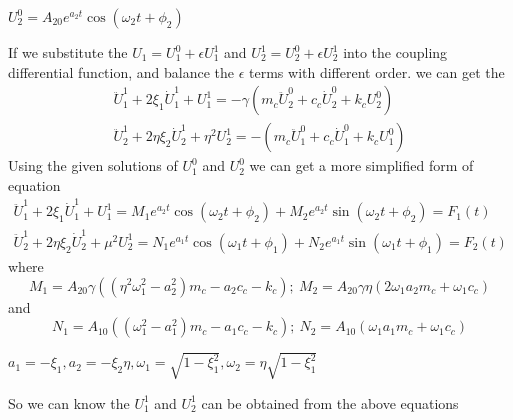 \documentclass{article}
\begin{document}
$U_2^0=A_{20} e^{a_2 t}\cos(\omega_2 t + \phi_2)$

If we substitute the $U_1=U_1^0+\epsilon U_1^1$ and $U_2^1=U_2^0+\epsilon U_2^1$ into the coupling differential function, and balance the $\epsilon$ terms with different order. we can get the 
\begin{align}
    \ddot{U}_1^1+2 \xi_1 \dot{U}_1^1+U_1^1=- \gamma (m_c \ddot{U}_2^0+c_c \dot{U}_2^0+k_c U_2^0)\\
    \ddot{U}_2^1+2 \eta \xi_2 \dot{U}_2^1+\eta^2 U_2^1= -(m_c \ddot{U}_1^0+c_c \dot{U}_1^0+k_c U_1^0)
\end{align}
Using the given solutions of $U_1^0$ and $U_2^0$ we can get a more simplified form of equation
\begin{align}
    \ddot{U}_1^1+2 \xi_1 \dot{U}_1^1+U_1^1=M_1 e^{a_2 t} \cos(\omega_2 t+\phi_2) +M_2 e^{a_2 t}\sin(\omega_2 t+\phi_2)=F_1(t)\\ \label{eq: correction U21}
    \ddot{U}_2^1+2 \eta \xi_2 \dot{U}_2^1+\mu^2 U_2^1= N_1 e^{a_1 t}\cos(\omega_1 t+\phi_1)+N_2 e^{a_1 t} \sin(\omega_1 t +\phi_1)=F_2(t)
\end{align}
where $$ M_1=A_{20}\gamma ((\eta^{2} \omega_{1}^{2} -a_2^2) m_c -a_{2} c_c -k_c);~M_2=A_{20} \gamma \eta (2 \omega_{1} a_{2} m_c+\omega_{1} c_c)$$
and
$$N_1=A_{10} ((\omega_1^2 - a_1^2) m_c-a_1 c_c-k_c);~N_2=A_{10}(\omega_1 a_1 m_c+\omega_1 c_c)$$ 

$a_1=-\xi_1,a_2=-\xi_2 \eta, \omega_1=\sqrt{1-\xi_1^2}, \omega_2= \eta \sqrt{1-\xi_1^2}$



So we can know the $U_1^1$ and $U_2^1$ can be obtained from the above equations
\end{document}
